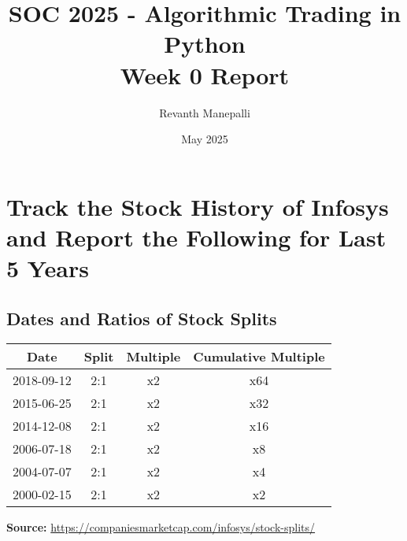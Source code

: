 \documentclass{article}
\title{SOC 2025 - Algorithmic Trading in Python\\Week 0 Report}
\author{Revanth Manepalli}
\date{May 2025}
\begin{document}
\maketitle

\section{Track the Stock History of Infosys and Report the Following for Last 5 Years}

\subsection{Dates and Ratios of Stock Splits}
\begin{table}[h]
    \centering
    \begin{tabular}{|c|c|c|c|}
        \hline
        \textbf{Date} & \textbf{Split} & \textbf{Multiple} & \textbf{Cumulative Multiple} \\
        \hline
        2018-09-12 & 2:1 & x2 & x64 \\
        2015-06-25 & 2:1 & x2 & x32 \\
        2014-12-08 & 2:1 & x2 & x16 \\
        2006-07-18 & 2:1 & x2 & x8 \\
        2004-07-07 & 2:1 & x2 & x4 \\
        2000-02-15 & 2:1 & x2 & x2 \\
        \hline
    \end{tabular}
    \label{tab:infosys-splits}
\end{table}
\noindent\textbf{Source:} \href{https://companiesmarketcap.com/infosys/stock-splits/}{https://companiesmarketcap.com/infosys/stock-splits/}
\end{document}
